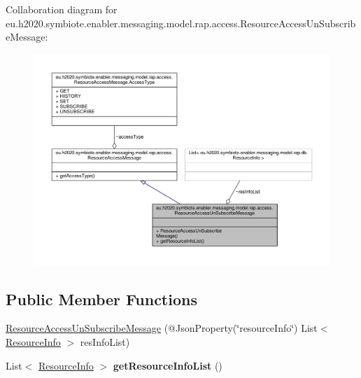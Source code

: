 Collaboration diagram for eu.\+h2020.\+symbiote.\+enabler.\+messaging.\+model.\+rap.\+access.\+Resource\+Access\+Un\+Subscribe\+Message\+:
\nopagebreak
\begin{figure}[H]
\begin{center}
\leavevmode
\includegraphics[width=350pt]{classeu_1_1h2020_1_1symbiote_1_1enabler_1_1messaging_1_1model_1_1rap_1_1access_1_1ResourceAccessUnSubscribeMessage__coll__graph}
\end{center}
\end{figure}
\subsection*{Public Member Functions}
\begin{DoxyCompactItemize}
\item 
\hyperlink{classeu_1_1h2020_1_1symbiote_1_1enabler_1_1messaging_1_1model_1_1rap_1_1access_1_1ResourceAccessUnSubscribeMessage_ade3281f6257947452ff83e796e66b8fa}{Resource\+Access\+Un\+Subscribe\+Message} (@Json\+Property(\char`\"{}resource\+Info\char`\"{}) List$<$ \hyperlink{classeu_1_1h2020_1_1symbiote_1_1enabler_1_1messaging_1_1model_1_1rap_1_1db_1_1ResourceInfo}{Resource\+Info} $>$ res\+Info\+List)
\item 
\mbox{\label{classeu_1_1h2020_1_1symbiote_1_1enabler_1_1messaging_1_1model_1_1rap_1_1access_1_1ResourceAccessUnSubscribeMessage_ad9f8abbaeaf57610bfb7844120c9f622}} 
List$<$ \hyperlink{classeu_1_1h2020_1_1symbiote_1_1enabler_1_1messaging_1_1model_1_1rap_1_1db_1_1ResourceInfo}{Resource\+Info} $>$ {\bfseries get\+Resource\+Info\+List} ()
\end{DoxyCompactItemize}


